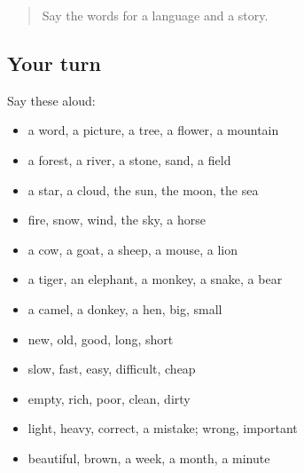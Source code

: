 \label{lesson:AR-R99-first-pass-nature-animals-and-describing-words}



\begin{quote}
Say the words for a language and a story.
\end{quote}

\subsection*{Your turn}
Say these aloud:

\begin{itemize}
\raggedright
  \item a word, a picture, a tree, a flower, a mountain
  \item a forest, a river, a stone, sand, a field
  \item a star, a cloud, the sun, the moon, the sea
  \item fire, snow, wind, the sky, a horse
  \item a cow, a goat, a sheep, a mouse, a lion
  \item a tiger, an elephant, a monkey, a snake, a bear
  \item a camel, a donkey, a hen, big, small
  \item new, old, good, long, short
  \item slow, fast, easy, difficult, cheap
  \item empty, rich, poor, clean, dirty
  \item light, heavy, correct, a mistake; wrong, important
  \item beautiful, brown, a week, a month, a minute
\end{itemize}

